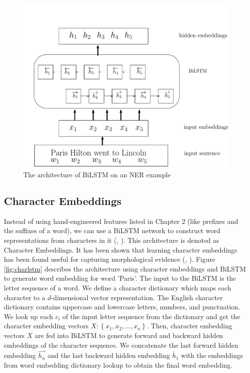\begin{figure}
  \centering
  \includegraphics[scale=0.6]{bilstm.pdf}
 \caption{The architecture of BiLSTM on an NER example}
  \label{fig:bilstm}
\end{figure}

\subsection{Character Embeddings}

Instead of using hand-engineered features listed in Chapter 2 (like prefixes and the suffixes of a word), we can use a BiLSTM network to construct word representations from characters in it (\citeauthor{lample2016neural}, \citeyear{lample2016neural}). This architecture is denoted as Character Embeddings. It has been shown that learning character embeddings has been found useful for capturing morphological evidence (\citeauthor{ling2015finding}, \citeyear{ling2015finding}). Figure \ref{fig:charlstm} describes the architecture using character embeddings and BiLSTM to generate word embedding for word 'Paris'. The input to the BiLSTM is the letter sequence of a word. We define a character dictionary which maps each character to a $d$-dimensional vector representation. The English character dictionary contains uppercase and lowercase letters, numbers, and punctuation. We look up each $c_{i}$ of the input letter sequence from the dictionary and get the character embedding vectors $X:\left\{x_{1},x_{2},\dots,x_{n}\right\}$. Then, character embedding vectors $X$ are fed into BiLSTM to generate forward and backward hidden embeddings of the character sequence. We concatenate the last forward hidden embedding $\overrightarrow {h_{n}}$ and the last backward hidden embedding $\overleftarrow {h_{1}}$ with the embeddings from word embedding dictionary lookup to obtain the final word embedding.

